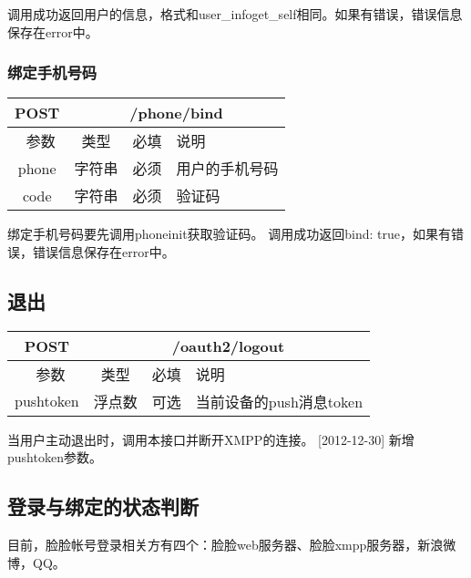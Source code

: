 调用成功返回用户的信息，格式和user\_info\/get\_self相同。如果有错误，错误信息保存在error中。



\subsubsection{绑定手机号码}
\label{hash_algorithm}

\begin{table}[H]
   \begin{center}
\begin{tabular}{|c|c|c|p{12cm}|}
\hline
POST & \multicolumn{3}{|c|}{/phone/bind} \\
\hline\hline
 \  参数  & 类型 & 必填 &  说明  \\
\hline
 phone  & 字符串 & 必须 &  用户的手机号码\\
\hline
 code  & 字符串 & 必须 &  验证码\\
\hline
\end{tabular}
   \end{center}
\end{table}

绑定手机号码要先调用phone\/init获取验证码。
调用成功返回{bind: true}，如果有错误，错误信息保存在error中。



\subsection{退出}

\begin{table}[H]
   \begin{center}
\begin{tabular}{|c|c|c|p{12cm}|}
\hline
POST & \multicolumn{3}{|c|}{/oauth2/logout} \\
\hline\hline
 \  参数  & 类型 & 必填 &  说明  \\
\hline
    pushtoken  & 浮点数 & 可选 &  当前设备的push消息token\\
\hline
\end{tabular}
   \end{center}
\end{table}

当用户主动退出时，调用本接口并断开XMPP的连接。
[2012-12-30] 新增pushtoken参数。



\subsection{登录与绑定的状态判断}
目前，脸脸帐号登录相关方有四个：脸脸web服务器、脸脸xmpp服务器，新浪微博，QQ。


